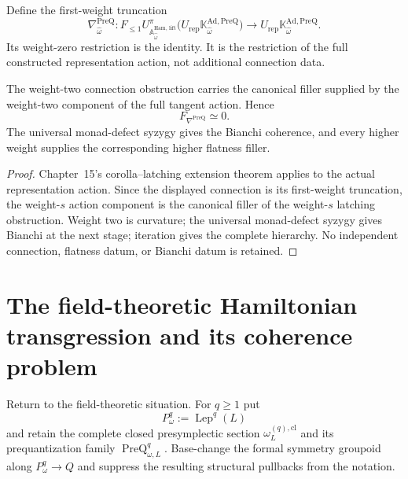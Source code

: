 \begin{definition}
\label{def:prequantum-canonical-coefficient-connection}
Define the first-weight truncation
\[
\boxed{
\nabla_{\widehat\omega}^{\mathrm{PreQ}}:
F_{\le1}
U^\pi_{\mathbb A_{\widehat\omega}^{\mathrm{Ham,\,lift}}}
\bigl(U_{\mathrm{rep}}\mathbb K_{\widehat\omega}^{\mathrm{Ad,PreQ}}\bigr)
\longrightarrow
U_{\mathrm{rep}}\mathbb K_{\widehat\omega}^{\mathrm{Ad,PreQ}}.
}
\]
Its weight-zero restriction is the identity.  It is the restriction of the full
constructed representation action, not additional connection data.
\end{definition}

\begin{theorem}
\label{thm:prequantum-curvature-bianchi-hierarchy}
The weight-two connection obstruction carries the canonical filler supplied by
the weight-two component of the full tangent action.  Hence
\[
\boxed{F_{\nabla^{\mathrm{PreQ}}}\simeq0.}
\]
The universal monad-defect syzygy gives the Bianchi coherence, and every higher
weight supplies the corresponding higher flatness filler.
\end{theorem}

\begin{proof}
Chapter~15's corolla--latching extension theorem applies to the actual
representation action.  Since the displayed connection is its first-weight
truncation, the weight-$s$ action component is the canonical filler of the
weight-$s$ latching obstruction.  Weight two is curvature; the universal
monad-defect syzygy gives Bianchi at the next stage; iteration gives the complete
hierarchy.  No independent connection, flatness datum, or Bianchi datum is
retained.
\end{proof}

\section{The field-theoretic Hamiltonian transgression and its coherence problem}
\label{sec:prequantum-differential-lift-hamiltonian-pair}

Return to the field-theoretic situation.  For $q\ge1$ put
\[
P_\omega^q:=\operatorname{Lep}^q(L)
\]
and retain the complete closed presymplectic section
$\omega_L^{(q),\mathrm{cl}}$ and its prequantization family
$\operatorname{PreQ}_{\omega,L}^{q}$.
Base-change the formal symmetry groupoid along $P_\omega^q\to Q$ and suppress the
resulting structural pullbacks from the notation.


